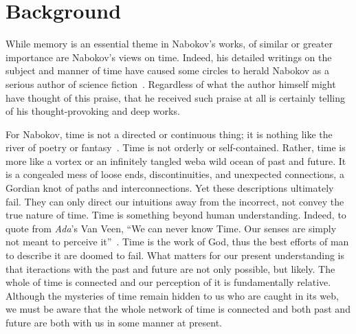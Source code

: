 \section{Background}
\label{background}


While memory is an essential theme in Nabokov's works, of similar or greater importance are Nabokov's views on time. 
Indeed, his detailed writings on the subject and manner of time have caused some circles to herald Nabokov as a serious author of science fiction~\cite{swanson}.
Regardless of what the author himself might have thought of this praise, that he received such praise at all is certainly telling of his thought-provoking and deep works.

For Nabokov, time is not a directed or continuous thing; it is nothing like the river of poetry or fantasy~\cite{time}.
Time is not orderly or self-contained. 
Rather, time is more like a vortex or an infinitely tangled web\textemdash a wild ocean of past and future.
It is a congealed mess of loose ends, discontinuities, and unexpected connections, a Gordian knot of paths and interconnections.
Yet these descriptions ultimately fail.
They can only direct our intuitions away from the incorrect, not convey the true nature of time.
Time is something beyond human understanding.
Indeed, to quote from \emph{Ada}'s Van Veen, ``We can never know Time. Our senses are simply not meant to perceive it''~\cite{ada}.
Time is the work of God, thus the best efforts of man to describe it are doomed to fail.
What matters for our present understanding is that iteractions with the past and future are not only possible, but likely. 
The whole of time is connected and our perception of it is fundamentally relative. 
Although the mysteries of time remain hidden to us who are caught in its web, we must be aware that the whole network of time is connected and both past and future are both with us in some manner at present.

